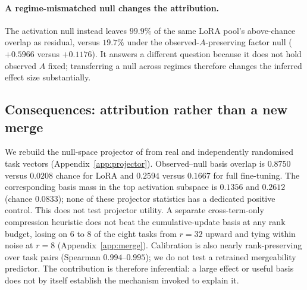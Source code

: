 \paragraph{A regime-mismatched null changes the attribution.}
The activation null instead leaves $99.9\%$ of the same LoRA pool's above-chance overlap as
residual, versus $19.7\%$ under the observed-$A$-preserving factor null ($+0.5966$ versus
$+0.1176$). It answers a different question because it does not hold observed $A$ fixed;
transferring a null across regimes therefore changes the inferred effect size substantially.

\subsection{Consequences: attribution rather than a new merge}
\label{sec:projector}
\label{sec:merge}
\label{sec:ranking}
We rebuild the null-space projector of \citet{qiu2026nufilt} from real and independently
randomised task vectors (Appendix~\ref{app:projector}). Observed--null basis overlap is $0.8750$
versus $0.0208$ chance for LoRA and $0.2594$ versus $0.1667$ for full fine-tuning. The corresponding
basis mass in the top activation subspace is $0.1356$ and $0.2612$ (chance $0.0833$); none of
these projector statistics has a dedicated positive control. This does not test projector utility.
A separate cross-term-only compression heuristic does not beat the cumulative-update basis at any
rank budget, losing on $6$ to $8$ of the eight tasks from $r=32$ upward and tying within noise at
$r=8$ (Appendix~\ref{app:merge}). Calibration is also nearly rank-preserving over task pairs
(Spearman $0.994$--$0.995$); we do not test a retrained mergeability predictor. The contribution
is therefore inferential: a large effect or useful basis does not by itself establish the
mechanism invoked to explain it.
